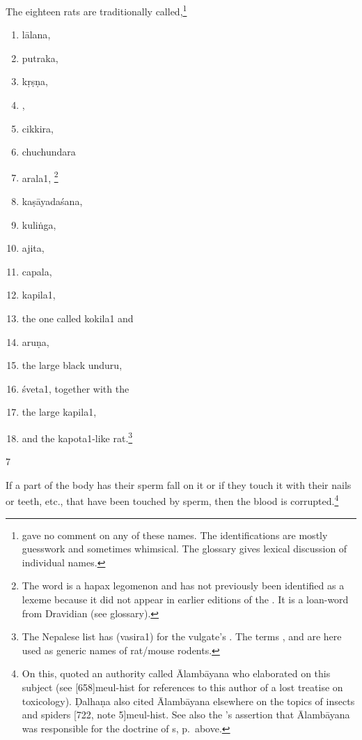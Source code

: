 \begin{translation}
    The eighteen rats are traditionally called,\footnote{ 
    gave no 
    comment on any of these names.  The identifications are 
    mostly guesswork and sometimes whimsical.  The glossary gives lexical 
    discussion of individual names.}
\begin{multicols}{2}
    \begin{enumerate}
        \item \Gls{lālana},
        \item \Gls{putraka},
        \item \Gls{kṛṣṇa},
        \item {},
        \item \Gls{cikkira}, %
        \item \Gls{chuchundara} %
        \item \Gls{arala1},%
\footnote{The word  is a hapax legomenon and has not 
previously been identified as a lexeme because it did not appear in earlier 
editions of the \SS.  It is a loan-word from Dravidian (see glossary).}        
        \item \Gls{kaṣāyadaśana},
        \item \Gls{kuliṅga},
        \item \Gls{ajita},
        \item \Gls{capala},
        \item \Gls{kapila1},
        \item the one called \Gls{kokila1} and 
        \item \Gls{aruṇa},
        \item the large black \gls{unduru}, 
        \item \Gls{śveta1}, together with the
        \item the large \Gls{kapila1},
        \item and the \Gls{kapota1}-like rat.\footnote{The Nepalese list has 
         (\Gls{vasira1}) for the 
        vulgate's .  The terms ,  and 
         are here used as generic names of rat/mouse rodents.}
\end{enumerate}
    \end{multicols}
\medskip
    
\item[7]

If a part of the body has their sperm fall on it or if they touch it
with their nails or teeth, etc., that have been touched by sperm,
then the blood is corrupted.\footnote{\label{alambayana2}On this,
     quoted an authority called Ālambāyana who
    elaborated on this subject (see [658]{meul-hist} for
    references to this author of a lost treatise on toxicology). Ḍalhaṇa
    also cited Ālambāyana elsewhere on the topics of insects and spiders
    [722, note 5]{meul-hist}. See also the \AS's assertion 
    that Ālambāyana was responsible for the doctrine of s, p.\,\pageref{alambayana1} above.
    
}
\end{translation}
